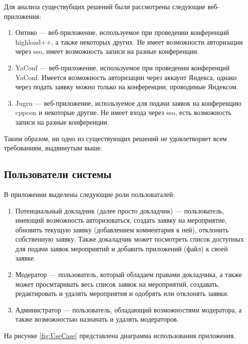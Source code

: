 Для анализа существубщих решений были рассмотрены следующие веб-приложения:
\begin{enumerate}
	\item Онтико\cite{ontico} --- веб-приложение, используемое при проведении конференций highload++, а также некоторых других. Не имеет возможности авторизации через sso, имеет возможность записи на разные конференции.
	\item YaConf\cite{yaconf} --- веб-приложение, используемое при проведении конференций YaConf. Имеется возможность авторизации через аккаунт Яндекса, однако через подать заявку можно только на конференции, проводимые Яндексом.
	\item Jugru\cite{jugru} --- веб-приложение, используемое для подачи заявок на конференцию cppcon и некоторые другие. Не имеет входа через sso, есть возможность записи на разные конференции.
\end{enumerate}

Таким образом, ни одно из существующих решений не удовлетворяет всем требованиям, выдвинутым выше.

\subsection{Пользователи системы}

В приложении выделены следующие роли пользоваталей:
\begin{enumerate}
	\item Потенциальный докладчик (далее просто докладчик) --- пользователь, имеющий возможность авторизоваться, создать заявку на мероприятие, обновить текущую заявку (добавлением комментария к ней), отклонить собственную заявку. Также докаладчик может посмотреть список доступных для подачи заявок мероприятий и добавить приложений (файл) к своей заявке.
	\item Модератор --- пользователь, который обладаем правами докладчика, а также может просмтаривать весь список заявок на мероприятий, создавать, редактировать и удалять мероприятия и одобрять или отклонять заявки.
	\item Администратор --- пользователь, обладающий возможностями модератора, а также возможностью назначать и удалять модераторов.
\end{enumerate}

На рисунке \ref{fig:UseCase} представлена диаграмма использования приложения.

